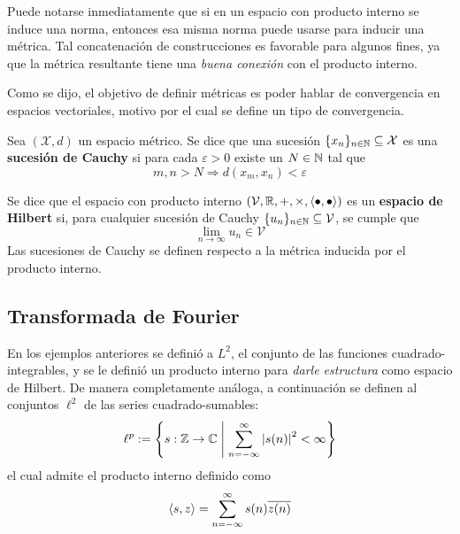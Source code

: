 Puede notarse inmediatamente que si en un espacio con producto interno se induce una norma, entonces esa misma norma puede usarse para inducir una métrica.
%
Tal concatenación de construcciones es favorable para algunos fines, ya que la métrica resultante tiene una \textit{buena conexión} con el producto interno.

Como se dijo, el objetivo de definir métricas es poder hablar de convergencia en espacios vectoriales, motivo por el cual se define un tipo de convergencia.

\begin{definicion}
Sea $(\mathcal{X},d)$ un espacio métrico. Se dice que una sucesión $\{x_n\}_{n\in \mathbb{N}} \subseteq \mathcal{X}$ es una \textbf{sucesión de Cauchy} si para cada $\varepsilon > 0$ existe un $N \in \mathbb{N}$ tal que
\begin{equation}
m, n > N \Rightarrow d(x_m, x_n) < \varepsilon
\end{equation}
\end{definicion}

\begin{definicion}
Se dice que el espacio con producto interno $(\mathcal{V},\mathbb{R},+,\times, \left\langle \bullet,\bullet \right\rangle)$ es un \textbf{espacio de Hilbert} si, para cualquier sucesión de Cauchy $\{u_n\}_{n\in \mathbb{N}} \subseteq \mathcal{V}$, se cumple que
\begin{equation}
\lim_{n\rightarrow\infty} u_n \in \mathcal{V}
\end{equation}
Las sucesiones de Cauchy se definen respecto a la métrica inducida por el producto interno.
\end{definicion}


\subsection{Transformada de Fourier}
\label{sec:fourier1}

En los ejemplos anteriores se definió a $L^{2}$, el conjunto de las funciones cuadrado-integrables, y se le definió un producto interno para \textit{darle estructura} como espacio de Hilbert.
%
De manera completamente análoga, a continuación se definen al conjuntos $\ell^{2}$ de las series cuadrado-sumables:
\begin{equation}
\ell^{p} := \left\{ s: \mathbb{Z}\rightarrow\mathbb{C} \mathrel{}\middle|\mathrel{} \sum_{n=-\infty}^{\infty} \left| s(n) \right|^{2} < \infty \right\}
\end{equation}
el cual admite el producto interno definido como
\begin{equation}
\left\langle s,z \right\rangle = \sum_{n=-\infty}^{\infty} s(n) \overline{z(n)}\\
\end{equation}

